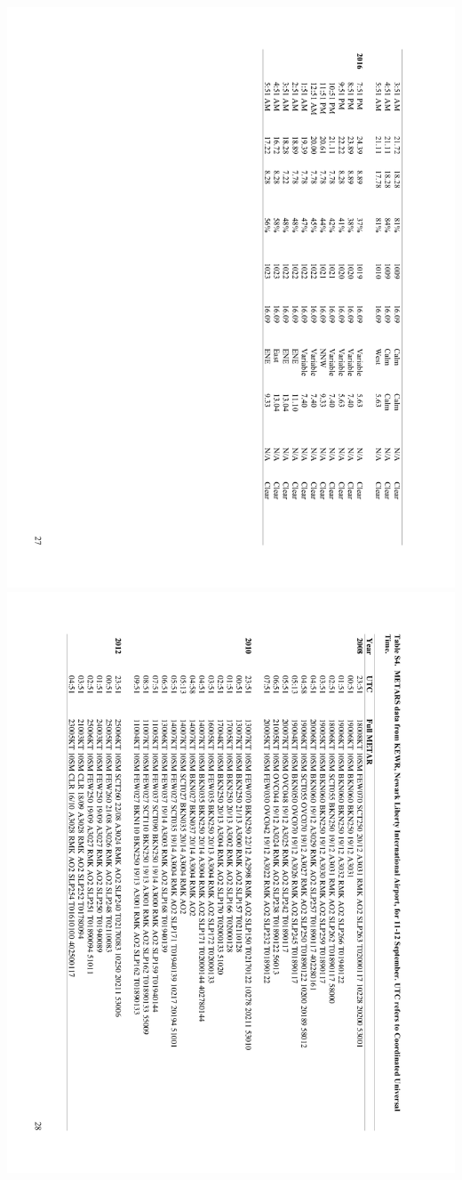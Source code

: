 \documentclass[a4paper, twoside]{templates/ociamthesis}
\begin{document}
\includegraphics[width=1\linewidth]{pdf_chapters/lights/lights_supp_crop_Part31}
\includegraphics[width=1\linewidth]{pdf_chapters/lights/lights_supp_crop_Part32}
\end{document}
